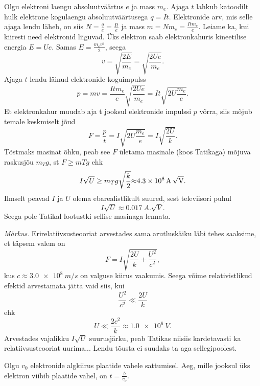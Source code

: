 \documentclass[10pt, twoside]{article}
\begin{document}
{
\solu
Olgu elektroni laengu absoluutväärtus $e$ ja mass $m_e$. Ajaga $t$ lahkub katoodilt hulk elektrone kogulaengu absoluutväärtusega $q = It$. Elektronide arv, mis selle ajaga lendu läheb, on siis $N = \frac{q}{e} = \frac{It}{e}$ ja mass $m = Nm_e = \frac{Itm_e}{e}$. Leiame ka, kui kiiresti need elektronid liiguvad. Üks elektron saab elektronkahuris kineetilise energia $E = Ue$. Samas $E = \frac{m_ev^2}{2}$, seega
\[
v=\sqrt{\frac{2 E}{m_{e}}}=\sqrt{\frac{2 U e}{m_{e}}}. 
\]
Ajaga $t$ lendu läinud elektronide koguimpulss
\[
p=m v=\frac{I t m_{e}}{e} \sqrt{\frac{2 U e}{m_{e}}}=I t \sqrt{2 U \frac{m_{e}}{e}}.
\]
Et elektronkahur muudab aja t jooksul elektronide impulssi $p$ võrra, siis mõjub temale keskmiselt jõud
\[
F=\frac{p}{t}=I \sqrt{2 U \frac{m_{e}}{e}}=I \sqrt{\frac{2 U}{k}}.
\] 
Tõstmaks masinat õhku, peab see $F$ ületama masinale (koos Tatikaga) mõjuva raskusjõu $m_T g$, st $F \geq mT g$ ehk
\[
I \sqrt{U} \geq m_{T} g \sqrt{\frac{k}{2}} \SI{\approx 4,3e8}{A.\sqrt{V}}. 
\]
Ilmselt peavad $I$ ja $U$ olema ebarealistlikult suured, sest televiisori puhul 
\[
I \sqrt U \approx \SI{0,017}{A.\sqrt{V}}.
\]
Seega pole Tatikal lootustki sellise masinaga lennata.

\emph{Märkus}. Erirelatiivsusteooriat arvestades sama arutluskäiku läbi tehes saaksime, et täpsem valem on 
\[
F=I \sqrt{\frac{2 U}{k}+\frac{U^{2}}{c^{2}}},
\]
kus $c \approx \SI{3,0e8}{m/s}$ on valguse kiirus vaakumis. Seega võime relativistlikud efektid arvestamata jätta vaid siis, kui 
\[
\frac{U^2}{c^2} \ll \frac{2U}{k}
\]
ehk 
\[
U \ll \frac{2 c^{2}}{k} \approx \SI{1,0e6}{V}.
\] 
Arvestades vajalikku $I \sqrt U$ suurusjärku, peab Tatikas niisiis kardetavasti ka relatiivsusteooriat uurima... Lendu tõusta ei suudaks ta aga sellegipoolest.
\probend
\bigskip


\solu
Olgu $v_0$ elektronide algkiirus plaatide vahele sattumisel. Aeg, mille jooksul üks elektron viibib plaatide vahel, on $t = \frac{b}{v_o}$.

}
\end{document}
